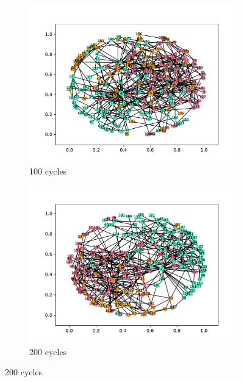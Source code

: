 \begin{figure}
  \centering
  \begin{subfigure}[t]{.45\textwidth}
    \centering
    \includegraphics[trim={1cm .5cm 1cm 1cm}, clip, width=\linewidth]{img/pdf/plot-0100.pdf} 
    \caption{100 cycles} \label{fig:100}
  \end{subfigure}
  \begin{subfigure}[t]{.45\textwidth}
    \centering
    \includegraphics[trim={1cm .5cm 1cm 1cm}, clip, width=\linewidth]{img/pdf/plot-0200.pdf} 
    \caption{200 cycles} \label{fig:200}
  \end{subfigure}

  \vspace{0cm}


\end{figure}
